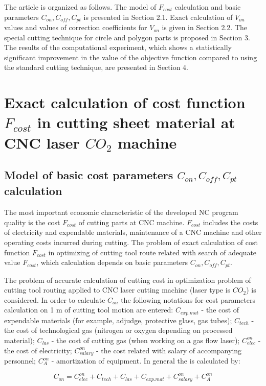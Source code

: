 \documentclass[runningheads]{llncs}
\begin{document}
The article is organized as follows.
The model of $F_{cost}$
calculation and basic parameters
$C_{on}, C_{off}, C_{pt}$
is presented in Section 2.1.
Exact calculation of $V_{on}$
values and values of correction coefficients for $V_{on}$
is given in Section 2.2.
The special cutting technique for circle and polygon parts
is proposed in Section 3.
The results of the computational experiment,
which shows a statistically significant improvement
in the value of the objective function
compared to using the standard cutting technique,
are presented in Section 4.

\section{Exact calculation of cost function $F_{cost}$ in cutting sheet material at CNC laser $CO_2$ machine}

\subsection{Model of basic cost parameters  $C_{on}, C_{off}, C_{pt}$ calculation}

The most important economic characteristic of the developed NC program quality is the cost $F_{cost}$
of cutting parts at CNC machine.
$F_{cost}$ includes the costs of electricity and expendable materials,
maintenance of a CNC machine and other operating costs incurred during cutting.
The problem of exact calculation of cost function $F_{cost}$
in optimizing of cutting tool route related with search of adequate value  $F_{cost}$,
which calculation depends on basic parameters  $C_{on}, C_{off}, C_{pt}$.

The problem of accurate calculation of cutting cost
in optimization problem of cutting tool routing applied to CNC laser cutting machine
(laser type is $CO_2$)
is considered.
In order to calculate $C_{on}$
the following notations for cost parameters calculation on 1 m of cutting tool motion are entered:
$C_{exp.mat}$ - the cost of expendable materials
(for example, adjudge, protective glass, gas tubes);
$C_{tech}$  - the cost of technological gas
(nitrogen or oxygen depending on processed material);
$C_{las}$ - the cost of cutting gas
(when working on a gas flow laser);
$C^{on}_{elec}$ - the cost of electricity;
$C^{on}_{salary}$ - the cost related with salary of accompanying personnel;
$C^{on}_A$ - amortization of equipment.
In general the  is calculated by:

\begin{equation}
C_{on} =
C^{on}_{elec} + C_{tech} + C_{las} + C_{exp.mat} + C^{on}_{salary} + C^{on}_A
\label{eq1.3}
\end{equation}
\end{document}
